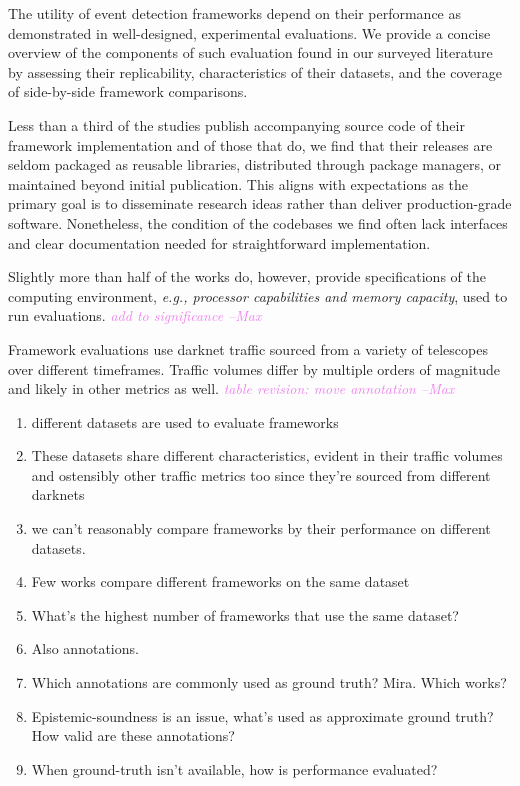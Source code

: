 \documentclass[manuscript,nonacm]{acmart}
\newcommand{\maxnote}[1]{\textit{\textcolor{violet}{#1 --Max}}}
\begin{document}
The utility of event detection frameworks depend on their performance as demonstrated in well-designed, experimental evaluations. 
We provide a concise overview of the components of such evaluation found in our surveyed literature by assessing their replicability, 
characteristics of their datasets, and the coverage of side-by-side framework comparisons.

Less than a third of the studies publish accompanying source code of their framework implementation and of those that do, 
we find that their releases are seldom packaged as reusable libraries, distributed through package managers, or maintained beyond initial publication.
This aligns with expectations as the primary goal is to disseminate research ideas rather than deliver production-grade software.
Nonetheless, the condition of the codebases we find often lack interfaces and clear documentation needed for straightforward implementation.

Slightly more than half of the works do, however, provide specifications of the computing environment, \textit{e.g., processor capabilities and memory capacity}, used to run evaluations.
\maxnote{add to significance}

Framework evaluations use darknet traffic sourced from a variety of telescopes over different timeframes.
Traffic volumes differ by multiple orders of magnitude and likely in other metrics as well.
\maxnote{table revision: move annotation}

\begin{enumerate}
	\item different datasets are used to evaluate frameworks
	\item These datasets share different characteristics, evident in their traffic volumes and ostensibly other traffic metrics too since they're sourced from different darknets
	\item we can't reasonably compare frameworks by their performance on different datasets.
	\item Few works compare different frameworks on the same dataset
	\item What's the highest number of frameworks that use the same dataset?
	\item Also annotations. 
	\item Which annotations are commonly used as ground truth? Mira. Which works?
	\item Epistemic-soundness is an issue, what's used as approximate ground truth? How valid are these annotations?
	\item When ground-truth isn't available, how is performance evaluated?
\end{enumerate}
\end{document}
